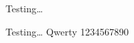 \documentclass[a4paper, 12pt, twoside]{report}
\begin{document}
Testing\ldots{}

\garamond

Testing\ldots{}
Qwerty 1234567890
\end{document}

